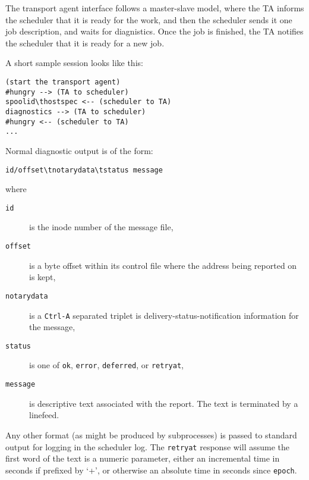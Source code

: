 The transport agent interface follows a master-slave model,
where  the  TA  informs the scheduler that it is ready for
the work, and then the scheduler sends it one job 
description,  and  waits  for diagnistics.  Once the job is 
finished, the TA notifies the scheduler that it is ready for
a new job.

A short sample session looks like this:
\begin{verbatim}
(start the transport agent)
#hungry --> (TA to scheduler)
spoolid\thostspec <-- (scheduler to TA)
diagnostics --> (TA to scheduler)
#hungry <-- (scheduler to TA)
...
\end{verbatim}

Normal diagnostic output is of the form:
\begin{verbatim}
id/offset\tnotarydata\tstatus message
\end{verbatim}

where
\begin{description}
\item[{\tt id}] \mbox{}

is the inode number of the message file,

\item[{\tt offset}] \mbox{}

is a byte offset within its control file where the address
being  reported on  is kept,

\item[{\tt notarydata}] \mbox{}

is a {\tt Ctrl-A} separated triplet is delivery-status-notification
information for  the message, 

\item[{\tt status}] \mbox{}

is one of {\tt ok}, {\tt error}, {\tt deferred}, or {\tt retryat},

\item[{\tt message}] \mbox{}

is  descriptive  text  associated
with  the  report.   The text is terminated by a linefeed.

\end{description}


Any other format (as might be produced by subprocesses) is
passed  to  standard  output  for logging in the scheduler
log. The {\tt retryat} response will assume the first word  of
the text is a numeric parameter, either an incremental
time in seconds if prefixed by `+', or otherwise an absolute
time in seconds since {\tt epoch}.


